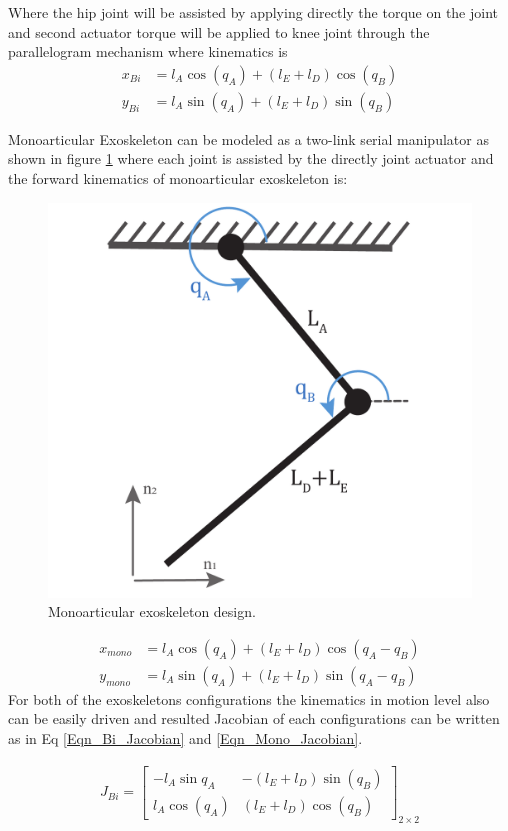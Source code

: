 \documentclass[10pt,letterpaper]{article}
\begin{document}
Where the hip joint will be assisted by applying directly the torque on the joint and second actuator torque will be applied to knee joint through the parallelogram mechanism where kinematics is 
\begin{align}\label{Eqn_Bi_Kin}
x_{Bi} &= l_ {A}\cos (q_ {A}) + (l_ {E} + l_ {D})\cos (q_ {B})\\
y_{Bi} &= l_ {A}\sin (q_ {A}) + (l_ {E} + l_ {D})\sin (q_ {B})
\end{align}

Monoarticular Exoskeleton can be modeled as a two-link serial manipulator as shown in figure \ref{Fig_Monoarticular_Exo_Mechanism} where each joint is assisted by the directly joint actuator and the forward kinematics of monoarticular exoskeleton is:
\begin{figure}[h!]
	\centering
	\includegraphics[width=2 in]{Cartoons/Monoarticular_Exo_Mechanism.pdf}
	\caption{Monoarticular exoskeleton design.}
	\label{Fig_Monoarticular_Exo_Mechanism}
\end{figure}

\begin{align}\label{Eqn_Mono_Kin}
x_{mono} &= l_ {A}\cos (q_ {A}) + (l_ {E} + l_ {D})\cos (q_ {A} - q_ {B})\\
y_{mono} &= l_ {A}\sin (q_ {A}) + (l_ {E} + l_ {D})\sin (q_ {A} - q_ {B})
\end{align}
For both of the exoskeletons configurations the kinematics in motion level also can be easily driven and resulted Jacobian of each configurations can be written as in Eq \eqref{Eqn_Bi_Jacobian} and \eqref{Eqn_Mono_Jacobian}.

\begin{gather}\label{Eqn_Bi_Jacobian}
J_{Bi} =
\begin{bmatrix}
-l_{A}\sin{q_{A}}  & -(l_ {E} + l_ {D})\sin (q_ {B})\\
l_ {A}\cos (q_{A}) &  (l_ {E} + l_ {D})\cos (q_ {B})
\end{bmatrix}_{2 \times 2}
\end{gather}
\end{document}
